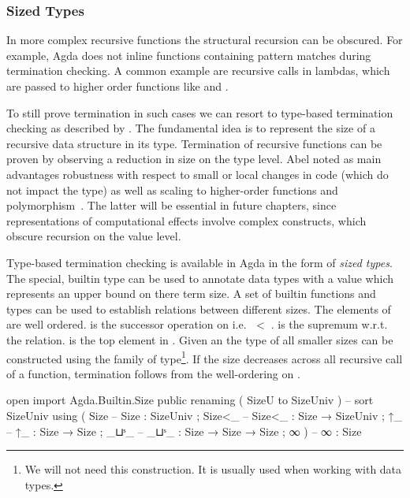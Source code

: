 \subsubsection{Sized Types}
\label{preliminaries:sized-types}

In more complex recursive functions the structural recursion can be obscured.
For example, Agda does not inline functions containing pattern matches during
termination checking.
A common example are recursive calls in lambdas, which are passed to higher
order functions like  and \AgdaFunction{>>=}.

To still prove termination in such cases we can resort to type-based
termination checking as described by \textcite{DBLP:journals/lmcs/Abel08}.
The fundamental idea is to represent the size of a recursive data structure in
its type.
Termination of recursive functions can be proven by observing a reduction in
size on the type level.
Abel noted as main advantages robustness with respect to small or local changes
in code (which do not impact the type) as well as scaling to higher-order
functions and polymorphism~\cite{DBLP:journals/lmcs/Abel08}.
The latter will be essential in future chapters, since representations of
computational effects involve complex constructs, which obscure recursion on the
value level.

Type-based termination checking is available in Agda in the form of
\textit{sized types}.
The special, builtin type  can be used to annotate data types
with a value which represents an upper bound on there term size. %
A set of builtin functions and types can be used to establish relations between
different sizes.
The elements of  are well ordered.
 is the successor operation on  i.e. 
$\;<\;$\AgdaSpace{}.
 is the supremum w.r.t. the relation.
 is the top element in .
Given an  the type of all smaller sizes can be constructed using
the  family of type\footnote{We will not need this
  construction. It is usually used when working with 
  data types.}.
If the size decreases across all recursive call of a function, termination
follows from the well-ordering on .

\begin{code}[hide]
open import Agda.Builtin.Size public
  renaming ( SizeU to SizeUniv )  --  sort SizeUniv
  using    ( Size                 --  Size   : SizeUniv
           ; Size<_               --  Size<_ : Size → SizeUniv
           ; ↑_                   --  ↑_     : Size → Size
           ; _⊔ˢ_                 --  _⊔ˢ_   : Size → Size → Size
           ; ∞ )                  --  ∞      : Size
\end{code}

